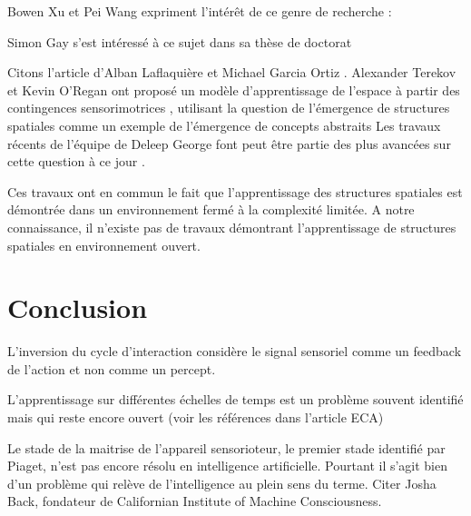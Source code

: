Bowen Xu et Pei Wang \cite{xu_essence_2025} expriment l'intérêt de ce genre de recherche : 
\begin{quote}
 \cite[p.~2]{xu_essence_2025}
\end{quote}

Simon Gay s'est intéressé à ce sujet dans sa thèse de doctorat \cite{gay_autonomous_2017} 

Citons l'article d'Alban Laflaquière et Michael Garcia Ortiz \og {} \fg \cite{laflaquiere_unsupervised_2019}.
Alexander Terekov et Kevin O'Regan ont proposé un modèle d'apprentissage de l'espace à partir des contingences sensorimotrices \cite{terekhov_learning_2019},  utilisant la question de l'émergence de structures spatiales comme un exemple de l'émergence de concepts abstraits
Les travaux récents de l'équipe de Deleep George font peut être partie des plus avancées sur cette question à ce jour \cite{raju_space_2022}.

Ces travaux ont en commun le fait que l'apprentissage des structures spatiales est démontrée dans un environnement fermé à la complexité limitée. 
A notre connaissance, il n'existe pas de travaux démontrant l'apprentissage de structures spatiales en environnement ouvert. 



\section{Conclusion}

L'inversion du cycle d'interaction considère le signal sensoriel comme un feedback de l'action et non comme un percept.


L'apprentissage sur différentes échelles de temps est un problème souvent identifié mais qui reste encore ouvert 
(voir les références dans l'article ECA)

Le stade de la maitrise de l'appareil sensorioteur, le premier stade identifié par Piaget, n'est pas encore résolu en intelligence artificielle. Pourtant il s'agit bien d'un problème qui relève de l'intelligence au plein sens du terme. Citer Josha Back, fondateur de Californian Institute of Machine Consciousness.